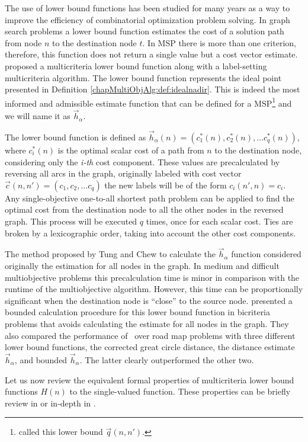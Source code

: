 The use of lower bound functions has been studied for many years as a way to improve the efficiency of combinatorial optimization problem solving. In graph search problems a lower bound function estimates the cost of a solution path from node $n$ to the destination node $t$. In MSP there is more than one criterion, therefore, this function does not return a single value but a cost vector estimate. \citet{Tung1992} proposed a multicriteria lower bound function along with a label-setting multicriteria algorithm. The lower bound function represents the ideal point presented in Definition \ref{chapMultiObjAlg:def:idealnadir}. This is indeed the most informed and admissible estimate function that can be defined for a MSP\footnote{\citet{Tung1992} called this lower bound $\vec q(n,n')$.} and we will name it as $\vec h_\alpha$.

The lower bound function is defined as $\vec h_\alpha (n)=(c_1^*(n), c_2^*(n), \ldots c_q^*(n))$, where $c_i^*(n)$ is the optimal scalar cost of a path from $n$ to the destination node, considering only the \textit{i-th} cost component. These values are precalculated by reversing all arcs in the graph, originally labeled with cost vector $\vec c(n,n') = (c_1, c_2,\ldots c_q)$ the new labels will be of the form $c_i(n',n) = c_i$. Any single-objective one-to-all shortest path problem can be applied to find the optimal cost from the destination node to all the other nodes in the reversed graph. This process will be executed $q$ times, once for each scalar cost. Ties are broken by a lexicographic order, taking into account the other cost components.

The method proposed by Tung and Chew to calculate the $\vec h_\alpha$ function considered originally the estimation for all nodes in the graph. In medium and difficult multiobjective problems this precalculation time is minor in comparison with the runtime of the multiobjective algorithm. However, this time can be proportionally significant when the destination node is ``close'' to the source node. \citet{Machuca2011b} presented a bounded calculation procedure for this lower bound function in bicriteria problems that avoids calculating the estimate for all nodes in the graph. They also compared the performance of \namoa \ over road map problems with three different lower bound functions, the corrected great circle distance, the distance estimate $\vec h_\alpha$, and bounded $\vec h_\alpha$. The latter clearly outperformed the other two. 

Let us now review the equivalent formal properties of multicriteria lower bound functions $H(n)$ to the single-valued function. These properties can be briefly review in \citep[2.1.2.1]{Machuca2012a} or in-depth in \citep{Pearl1984}. 

